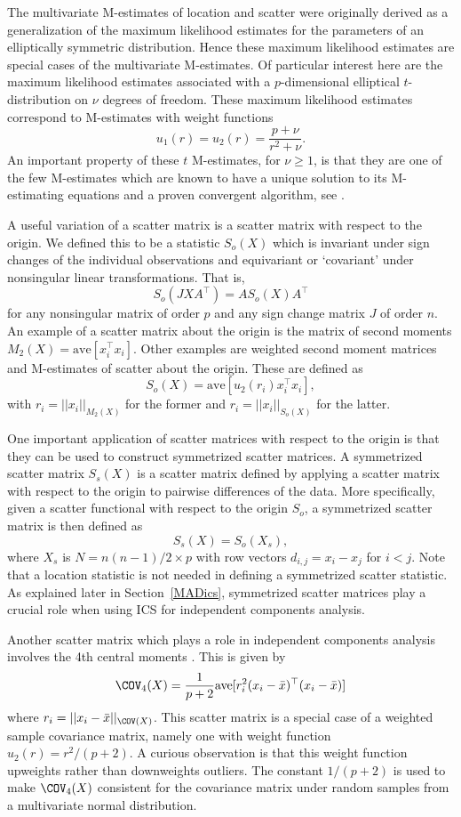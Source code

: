 \documentclass[article,nojss]{jss}
\newcommand{\ave}{\mathrm{ave}}
\begin{document}
The multivariate {M}-estimates of location and scatter were originally derived as a generalization of the maximum
likelihood estimates for the parameters of an elliptically symmetric distribution. Hence these maximum likelihood
estimates are special cases of the multivariate {M}-estimates. Of particular interest here are the maximum likelihood
estimates associated with a $p$-dimensional elliptical $t$-distribution on $\nu$ degrees of freedom.  These maximum likelihood
estimates correspond to {M}-estimates with weight functions
\[
 u_1(r) = u_2(r) = \frac{p + \nu}{r^2 + \nu}.
\]
An important property of these $t$ {M}-estimates, for $\nu \ge 1$, is that they are one of the few {M}-estimates
which are known to have a unique solution to its {M}-estimating equations and a proven convergent algorithm,
see \citet{KentTyler1991}.

A useful variation of a scatter matrix is a scatter matrix with respect to the origin. We defined this to be a statistic $S_o(X)$
which is invariant under sign changes of the individual observations and equivariant or `covariant' under nonsingular linear
transformations. That is,
\[
S_o(JXA^\top)=AS_o(X)A^\top
\]
for any nonsingular matrix of order $p$ and any sign change matrix $J$ of order $n$. An example of a scatter matrix about the
origin is the matrix of second moments $M_2(X) = \ave[x_i^\top x_i]$. Other examples are weighted second moment matrices
and {M}-estimates of scatter about the origin. These are defined as
\[
S_o(X) = \ave [u_2(r_i) x_i^\top x_i],
\]
with $r_i = ||x_i||_{M_2(X)}$ for the former and $r_i = ||x_i||_{S_o(X)}$ for the latter.

One important application of scatter matrices with respect to the origin is that they can be used to construct
symmetrized scatter matrices. A symmetrized scatter matrix $S_s(X)$ is a scatter matrix defined by applying
a scatter matrix with respect to the origin to pairwise differences of the data.  More specifically,
given a scatter functional with respect to the origin $S_o$, a symmetrized scatter matrix is then defined as
\[
S_s(X)=S_o(X_s),
\]
where $X_s$ is $N = n(n-1)/2 \times p$ with row vectors $d_{i,j} = x_i - x_j$ for $i < j$.  Note that a
location statistic is not needed in defining a symmetrized scatter statistic. As explained later in
Section~\ref{MADics}, symmetrized scatter matrices play a crucial role when using {ICS} for
independent components analysis.

Another scatter matrix which plays a role in independent components analysis involves the 4th central
moments \citep{Cardoso1989}.
This is given by
\[
\COV_4(X)=\frac{1}{p+2} \ave[r_i^2(x_i-\bar{x})^\top (x_i-\bar{x})]
\]
where $r_i=||x_i-\bar{x}||_{\COV(X)}$. This scatter matrix is a special case of a weighted sample covariance matrix, namely
one with weight function $u_2(r) = r^2/(p+2)$. A curious observation is that this weight function upweights rather
than downweights outliers. The constant $1/(p+2)$ is used to make $\COV_4(X)$ consistent for the covariance matrix under random
samples from a multivariate normal distribution.
\end{document}

